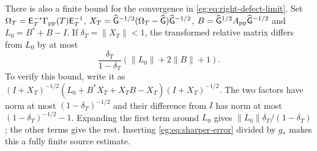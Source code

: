 \documentclass[11pt]{article}
\begin{document}
There is also a finite bound for the convergence in
\eqref{eg:eq:right-defect-limit}. Set
$\Omega_T=\mathsf E_T^{-*}\Gamma_{\rm pp}(T)\mathsf E_T^{-1}$,
$X_T=\widehat{\mathsf G}^{-1/2}(\Omega_T-\widehat{\mathsf G})\widehat{\mathsf G}^{-1/2}$,
$B=\widehat{\mathsf G}^{1/2}A_{\rm pp}\widehat{\mathsf G}^{-1/2}$ and
$L_0=B^*+B-I$. If $\delta_T=\|X_T\|<1$, the transformed relative
matrix differs from $L_0$ by at most
\[
 \frac{\delta_T}{1-\delta_T}
                     (\|L_0\|+2\|B\|+1).
 \tag{EG51}\label{eg:eq:defect-error}
\]
To verify this bound, write it as
$(I+X_T)^{-1/2}(L_0+B^*X_T+X_TB-X_T)(I+X_T)^{-1/2}$.
The two factors have norm at most $(1-\delta_T)^{-1/2}$ and their
difference from $I$ has norm at most $(1-\delta_T)^{-1/2}-1$.
Expanding the first term around $L_0$ gives
$\|L_0\|\delta_T/(1-\delta_T)$; the other terms give the rest.
Inserting \eqref{eg:eq:sharper-error} divided by $g_*$ makes this a
fully finite source estimate.
\end{document}
